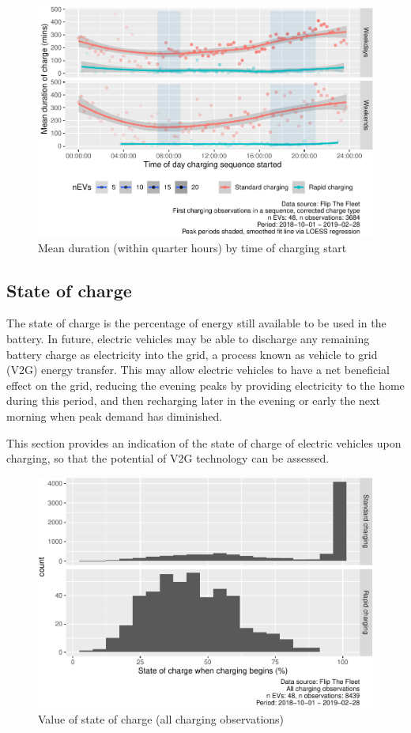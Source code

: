 \documentclass[]{article}
\begin{document}
\begin{figure}
\centering
\includegraphics{EVBB_report_v1_files/figure-latex/durationTimeMean-1.pdf}
\caption{\label{fig:durationTimeMean}Mean duration (within quarter hours) by time of charging start}
\end{figure}

\hypertarget{SoC}{%
\subsection{State of charge}\label{SoC}}

The state of charge is the percentage of energy still available to be used in the battery. In future, electric vehicles may be able to discharge any remaining battery charge as electricity into the grid, a process known as vehicle to grid (V2G) energy transfer. This may allow electric vehicles to have a net beneficial effect on the grid, reducing the evening peaks by providing electricity to the home during this period, and then recharging later in the evening or early the next morning when peak demand has diminished.

This section provides an indication of the state of charge of electric vehicles upon charging, so that the potential of V2G technology can be assessed.

\begin{figure}
\centering
\includegraphics{EVBB_report_v1_files/figure-latex/SoCplot1-1.pdf}
\caption{\label{fig:SoCplot1}Value of state of charge (all charging observations)}
\end{figure}
\end{document}

